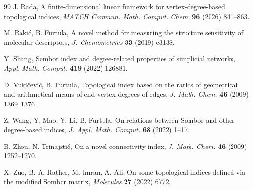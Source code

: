 \documentclass[a5paper, 10pt]{article}
\theoremstyle{plain}
\theoremstyle{remark}
\theoremstyle{definition}
\begin{document}
\begin{thebibliography}{99}
   J. Rada, A finite-dimensional linear
  framework for vertex-degree-based topological indices, \textit{MATCH
  Commun. Math. Comput. Chem.\/} \textbf{96} (2026) 841--863.

   M. Raki\'c, B. Furtula, A novel method for
  measuring the structure sensitivity of molecular descriptors, \textit{J.
  Chemometrics\/} \textbf{33} (2019) e3138.

  Y. Shang, Sombor index and degree-related properties of simplicial
  networks, \textit{Appl. Math. Comput.\/} \textbf{419} (2022) 126881.

   D. Vukičević, B. Furtula, Topological
  index based on the ratios of geometrical and arithmetical means of
  end-vertex degrees of edges, \textit{J. Math. Chem.\/} \textbf{46} (2009)
  1369--1376.

   Z. Wang, Y. Mao, Y. Li, B.
  Furtula, On relations between Sombor and other degree-based indices,
  \textit{J. Appl. Math. Comput.\/} \textbf{68} (2022) 1--17.

  B. Zhou, N. Trinajstić, On a novel connectivity index, \textit{J. Math.
  Chem.\/} \textbf{46} (2009) 1252--1270.

  X. Zuo, B. A. Rather, M. Imran, A. Ali, On some topological indices
  defined via the modified Sombor matrix, \textit{Molecules\/} \textbf{27}
  (2022) 6772.

  \end{thebibliography}
\end{document}
